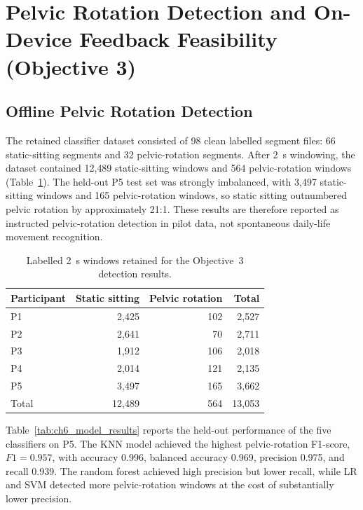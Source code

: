 \FloatBarrier

\section{Pelvic Rotation Detection and On-Device Feedback Feasibility (Objective 3)}

\subsection{Offline Pelvic Rotation Detection}

The retained classifier dataset consisted of 98 clean labelled segment files: 66 static-sitting segments and 32 pelvic-rotation segments. After 2~s windowing, the dataset contained 12{,}489 static-sitting windows and 564 pelvic-rotation windows (Table~\ref{tab:results_window_counts}). The held-out P5 test set was strongly imbalanced, with 3{,}497 static-sitting windows and 165 pelvic-rotation windows, so static sitting outnumbered pelvic rotation by approximately 21:1. These results are therefore reported as instructed pelvic-rotation detection in pilot data, not spontaneous daily-life movement recognition.

\begin{table}[!htbp]
    \centering
    \footnotesize
    \caption{Labelled 2~s windows retained for the Objective~3 detection results.}
    \label{tab:results_window_counts}
    \begin{tabular*}{\linewidth}{@{\extracolsep{\fill}}lrrr@{}}
        \toprule
        Participant & Static sitting & Pelvic rotation & Total \\
        \midrule
        P1 & 2{,}425 & 102 & 2{,}527 \\
        P2 & 2{,}641 & 70  & 2{,}711 \\
        P3 & 1{,}912 & 106 & 2{,}018 \\
        P4 & 2{,}014 & 121 & 2{,}135 \\
        P5 & 3{,}497 & 165 & 3{,}662 \\
        \midrule
        Total & 12{,}489 & 564 & 13{,}053 \\
        \bottomrule
    \end{tabular*}
\end{table}

Table~\ref{tab:ch6_model_results} reports the held-out performance of the five classifiers on P5. The KNN model achieved the highest pelvic-rotation F1-score, \(F1=0.957\), with accuracy 0.996, balanced accuracy 0.969, precision 0.975, and recall 0.939. The random forest achieved high precision but lower recall, while LR and SVM detected more pelvic-rotation windows at the cost of substantially lower precision.

